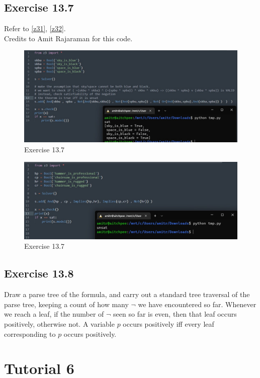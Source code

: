 \documentclass{article}
\begin{document}
\subsection*{Exercise 13.7}
Refer to \autoref{z31}, \autoref{z32}.\\
Credits to Amit Rajaraman for this code.
\begin{figure}[h]
	\centering
	\includegraphics[scale=0.3]{z31.jpeg}
	\caption{Exercise 13.7}
    \label{z31}
\end{figure}
\begin{figure}[h]
	\centering
	\includegraphics[scale=0.3]{z32.jpeg}
	\caption{Exercise 13.7}
    \label{z32}
\end{figure}
\subsection*{Exercise 13.8}
Draw a parse tree of the formula, and carry out a standard tree traversal of the parse tree, keeping a count of how many $\lnot$ we have encountered so far. Whenever we reach a leaf, if the number of $\lnot$ seen so far is even, then that leaf occurs positively, otherwise not. A variable $p$ occurs positively iff every leaf corresponding to $p$ occurs positively.
\section{Tutorial 6}
\end{document}
